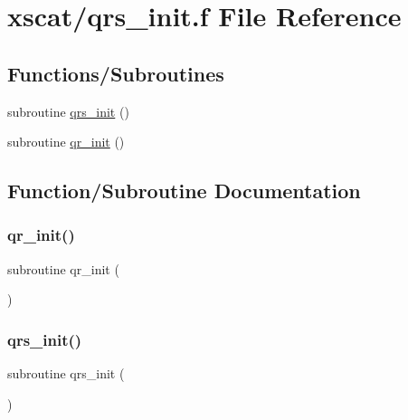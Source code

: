 \hypertarget{qrs__init_8f}{}\section{xscat/qrs\+\_\+init.f File Reference}
\label{qrs__init_8f}
\subsection*{Functions/\+Subroutines}
\begin{DoxyCompactItemize}
\item 
subroutine \hyperlink{qrs__init_8f_af82d63eb54761b8a00ca70d4a6a08d6b}{qrs\+\_\+init} ()
\item 
subroutine \hyperlink{qrs__init_8f_af7240c14716ac7a794546a49beaf0d88}{qr\+\_\+init} ()
\end{DoxyCompactItemize}


\subsection{Function/\+Subroutine Documentation}
\mbox{\label{qrs__init_8f_af7240c14716ac7a794546a49beaf0d88}} 
\subsubsection{\texorpdfstring{qr\+\_\+init()}{qr\_init()}}
{\footnotesize\ttfamily subroutine qr\+\_\+init (\begin{DoxyParamCaption}{ }\end{DoxyParamCaption})}

\mbox{\label{qrs__init_8f_af82d63eb54761b8a00ca70d4a6a08d6b}} 
\subsubsection{\texorpdfstring{qrs\+\_\+init()}{qrs\_init()}}
{\footnotesize\ttfamily subroutine qrs\+\_\+init (\begin{DoxyParamCaption}{ }\end{DoxyParamCaption})}

